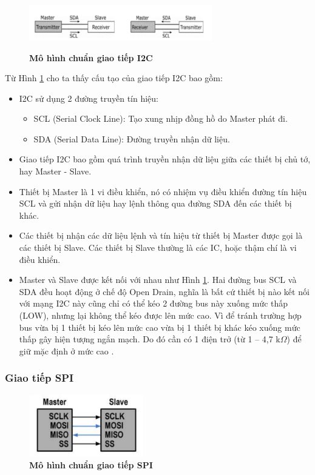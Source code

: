 \documentclass{article} %
\begin{document}
	
	\begin{figure}[!ht]
		\centering
		\includegraphics[width=8cm,height=2.3cm]{Images/I2C.png}
		\caption[Mô hình chuẩn giao tiếp I2C\cite{I2C}]{\bfseries \fontsize{12pt}{0pt}\selectfont Mô hình chuẩn giao tiếp I2C\cite{I2C}}
		\label{i2c}
	\end{figure}
	
	Từ Hình \ref{i2c} cho ta thấy cấu tạo của giao tiếp I2C bao gồm:
	
	\begin{itemize}
		\item I2C sử dụng 2 đường truyền tín hiệu:
		\begin{itemize}
			\item SCL (Serial Clock Line): Tạo xung nhịp đồng hồ do Master phát đi.
			\item SDA (Serial Data Line): Đường truyền nhận dữ liệu.
		\end{itemize}
		\item Giao tiếp I2C bao gồm quá trình truyền nhận dữ liệu giữa các thiết bị chủ tớ, hay Master - Slave.
		\item Thiết bị Master là 1 vi điều khiển, nó có nhiệm vụ điều khiển đường tín hiệu SCL và gửi nhận dữ liệu hay lệnh thông qua đường SDA đến các thiết bị khác.
		\item Các thiết bị nhận các dữ liệu lệnh và tín hiệu từ thiết bị Master được gọi là các thiết bị Slave. Các thiết bị Slave thường là các IC, hoặc thậm chí là vi điều khiển.
		\item Master và Slave được kết nối với nhau như Hình \ref{i2c}. Hai đường bus SCL và SDA đều hoạt động ở chế độ Open Drain, nghĩa là bất cứ thiết bị nào kết nối với mạng I2C này cũng chỉ có thể kéo 2 đường bus này xuống mức thấp (LOW), nhưng lại không thể kéo được lên mức cao. Vì để tránh trường hợp bus vừa bị 1 thiết bị kéo lên mức cao vừa bị 1 thiết bị khác kéo xuống mức thấp gây hiện tượng ngắn mạch. Do đó cần có 1 điện trở (từ 1 -- 4,7 k\(\Omega\)) để giữ mặc định ở mức cao .
	\end{itemize}
	
	
	\subsubsection{Giao tiếp SPI}
	\begin{figure}[!ht]
		\centering
		\includegraphics[width=5cm,height=2.7cm]{Images/SPI.png}
		\caption[Mô hình chuẩn giao tiếp SPI\cite{SPI}]{\bfseries \fontsize{12pt}{0pt}\selectfont Mô hình chuẩn giao tiếp SPI\cite{SPI}}
		\label{SPI}
	\end{figure}
	
\end{document}
